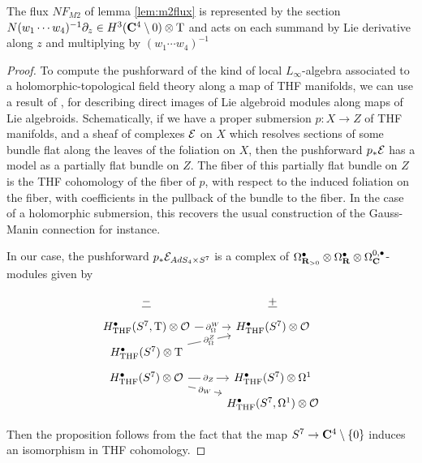 \documentclass[../main.tex]{subfiles}
\begin{document}
The flux $NF_{M2}$ of lemma \ref{lem:m2flux} is represented by the section $N (w_1\cdots w_4)^{-1}\partial_z \in H^3 (\mathbf{C}^4\setminus 0)\otimes {\mathrm{T}}$ and acts on each summand by Lie derivative along $z$ and multiplying by $(w_1\cdots w_4)^{-1}$

\begin{proof}
To compute the pushforward of the kind of local $L_\infty$-algebra associated to a holomorphic-topological field theory along a map of THF manifolds, we can use a result of \cite[Sec. 4.2]{KormanThesis}, \cite{KamberTondeur} for describing direct images of Lie algebroid modules along maps of Lie algebroids. Schematically, if we have a proper submersion $p : X\to Z$ of THF manifolds, and a sheaf of complexes $\mathcal{E}$ on $X$ which resolves sections of some bundle flat along the leaves of the foliation on $X$, then the pushforward $p_*\mathcal{E}$ has a model as a partially flat bundle on $Z$. The fiber of this partially flat bundle on $Z$ is the THF cohomology of the fiber of $p$, with respect to the induced foliation on the fiber, with coefficients in the pullback of the bundle to the fiber. In the case of a holomorphic submersion, this recovers the usual construction of the Gauss-Manin connection for instance. 

In our case, the pushforward $p_* \mathcal{E}_{AdS_4\times S^7}$ is a complex of $\Omega^\bullet_{\mathbf{R}_{>0}} \otimes \Omega^\bullet _{\mathbf{R}} \otimes \Omega^{0,\bullet}_{\mathbf{C}}$- modules given by 

\begin{equation}
  \label{eqn:ads4ss} 
  \begin{tikzcd}[row sep = 1 ex]
    \ul{-} & \ul{+} \\ 
H^\bullet_{\mr{THF}}(S^7, \T) \otimes \mc{O}\ar[r, "\del^W_\Omega" description] & H^\bullet_{\mr{THF}} (S^7) \otimes \mc O \\
H^\bullet_{\mr{THF}} (S^7)  \otimes \T\ar[ur, "\del^Z_\Omega" description] \\
H^\bullet_{\mr{THF}} (S^7)\otimes \mc{O}\ar[r, "\del_Z" description]\ar[dr, "\del_W" description] & H^\bullet_{\mr{THF}} (S^7) \otimes \Omega^1
 \\ & H^\bullet_{\mr{THF}} (S^7, \Omega^1)  \otimes \mc O
 \end{tikzcd}
\end{equation}

Then the proposition follows from the fact that the map $S^7\to \mathbf{C}^4\setminus \{0\}$ induces an isomorphism in THF cohomology.
\end{proof}
\end{document}
